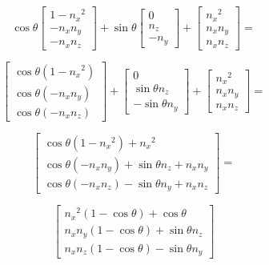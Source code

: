 \documentclass[11pt]{article}
\begin{document}
$$\cos\theta
\begin{bmatrix}
1-{n_x}^2 \\ -n_xn_y \\ -n_xn_z
\end{bmatrix}+\sin\theta
\begin{bmatrix}
0 \\ n_z \\ -n_y
\end{bmatrix}+
\begin{bmatrix}
{n_x}^2 \\ n_xn_y \\ n_xn_z
\end{bmatrix}=$$

$$
\begin{bmatrix}
\cos\theta(1-{n_x}^2) \\ \cos\theta(-n_xn_y) \\ \cos\theta(-n_xn_z)
\end{bmatrix}
+
\begin{bmatrix}
0 \\ \sin\theta n_z \\ -\sin\theta n_y
\end{bmatrix}
+
\begin{bmatrix}
{n_x}^2 \\ n_xn_y \\ n_xn_z
\end{bmatrix}=
$$

$$
\begin{bmatrix}
\cos\theta(1-{n_x}^2) + {n_x}^2 \\ 
\cos\theta(-n_xn_y) + \sin\theta n_z + n_xn_y \\
\cos\theta(-n_xn_z) - \sin\theta n_y + n_xn_z
\end{bmatrix}=
$$

$$
\begin{bmatrix}
{n_x}^2(1-\cos\theta) + \cos\theta \\ 
n_xn_y(1-\cos\theta) + \sin\theta n_z \\
n_xn_z(1-\cos\theta) - \sin\theta n_y
\end{bmatrix}
$$
\end{document}
